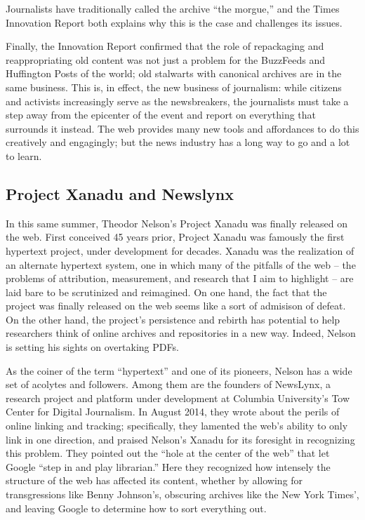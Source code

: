 Journalists have traditionally called the archive ``the morgue,'' and the Times Innovation Report both explains why this is the case and challenges its issues.

Finally, the Innovation Report confirmed that the role of repackaging and reappropriating old content was not just a problem for the BuzzFeeds and Huffington Posts of the world; old stalwarts with canonical archives are in the same business. This is, in effect, the new business of journalism: while citizens and activists increasingly serve as the newsbreakers, the journalists must take a step away from the epicenter of the event and report on everything that surrounds it instead. The web provides many new tools and affordances to do this creatively and engagingly; but the news industry has a long way to go and a lot to learn.

\subsection{Project Xanadu and Newslynx}

In this same summer, Theodor Nelson's Project Xanadu was finally released on the web. First conceived 45 years prior, Project Xanadu was famously the first hypertext project, under development for decades. Xanadu was the realization of an alternate hypertext system, one in which many of the pitfalls of the web -- the problems of attribution, measurement, and research that I aim to highlight -- are laid bare to be scrutinized and reimagined. On one hand, the fact that the project was finally released on the web seems like a sort of admisison of defeat. On the other hand, the project's persistence and rebirth has potential to help researchers think of online archives and repositories in a new way. Indeed, Nelson is setting his sights on overtaking PDFs.

As the coiner of the term ``hypertext'' and one of its pioneers, Nelson has a wide set of acolytes and followers. Among them are the founders of NewsLynx, a research project and platform under development at Columbia University's Tow Center for Digital Journalism. In August 2014, they wrote about the perils of online linking and tracking; specifically, they lamented the web's ability to only link in one direction, and praised Nelson's Xanadu for its foresight in recognizing this problem. They pointed out the ``hole at the center of the web'' that let Google ``step in and play librarian.'' Here they recognized how intensely the structure of the web has affected its content, whether by allowing for transgressions like Benny Johnson's, obscuring archives like the New York Times', and leaving Google to determine how to sort everything out.

